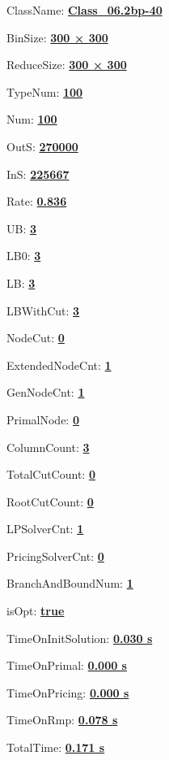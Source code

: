 \documentclass[11pt]{article}
\begin{document}
\pagestyle{empty}


ClassName: \underline{\textbf{Class_06.2bp-40}}
\par
BinSize: \underline{\textbf{300 × 300}}
\par
ReduceSize: \underline{\textbf{300 × 300}}
\par
TypeNum: \underline{\textbf{100}}
\par
Num: \underline{\textbf{100}}
\par
OutS: \underline{\textbf{270000}}
\par
InS: \underline{\textbf{225667}}
\par
Rate: \underline{\textbf{0.836}}
\par
UB: \underline{\textbf{3}}
\par
LB0: \underline{\textbf{3}}
\par
LB: \underline{\textbf{3}}
\par
LBWithCut: \underline{\textbf{3}}
\par
NodeCut: \underline{\textbf{0}}
\par
ExtendedNodeCnt: \underline{\textbf{1}}
\par
GenNodeCnt: \underline{\textbf{1}}
\par
PrimalNode: \underline{\textbf{0}}
\par
ColumnCount: \underline{\textbf{3}}
\par
TotalCutCount: \underline{\textbf{0}}
\par
RootCutCount: \underline{\textbf{0}}
\par
LPSolverCnt: \underline{\textbf{1}}
\par
PricingSolverCnt: \underline{\textbf{0}}
\par
BranchAndBoundNum: \underline{\textbf{1}}
\par
isOpt: \underline{\textbf{true}}
\par
TimeOnInitSolution: \underline{\textbf{0.030 s}}
\par
TimeOnPrimal: \underline{\textbf{0.000 s}}
\par
TimeOnPricing: \underline{\textbf{0.000 s}}
\par
TimeOnRmp: \underline{\textbf{0.078 s}}
\par
TotalTime: \underline{\textbf{0.171 s}}
\par
\newpage
\end{document}
